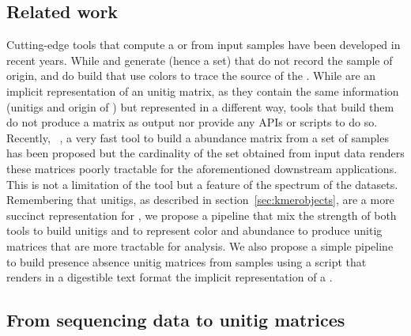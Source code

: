\subsection{Related work}
Cutting-edge tools that compute a \cdbg or \ccdbgs from input samples have been developed in recent years. While \bcalm and \cuttlefish generate \cdbg (hence a \kmer set) that do not record the sample of origin, \bifrost and \ggcat do build \ccdbgs that use colors to trace the source of the \kmers. While \ccdbgs are an implicit representation of an unitig matrix, as they contain the same information (unitigs and origin of \kmers) but represented in a different way, tools that build them do not produce a matrix as output nor provide any APIs or scripts to do so.\\
Recently, \kmt~\cite{kmtricks}, a very fast tool to build a \kmer abundance matrix from a set of samples has been proposed but the cardinality of the \kmer set obtained from input data renders these matrices poorly tractable for the aforementioned downstream applications. This is not a limitation of the tool but a feature of the \kmer spectrum of the datasets.\\
Remembering that unitigs, as described in section~\ref{sec:kmerobjects}, are a more succinct representation for \kmers, we propose a pipeline that mix the strength of both \cdbg tools to build unitigs and \kmt to represent \kmer color and abundance to produce unitig matrices that are more tractable for analysis. We also propose a simple pipeline to build presence absence unitig matrices from samples using a script that renders in a digestible text format the implicit representation of a \ccdbg.
\subsection{From sequencing data to unitig matrices}
